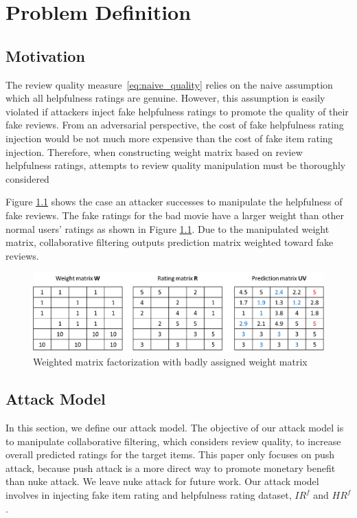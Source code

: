 \documentclass[master,english,final]{kaist-ucs}
\begin{document}
\chapter{Problem Definition}
\section{Motivation}
The review quality measure~\ref{eq:naive_quality} relies on the naive assumption which all helpfulness ratings are genuine.
However, this assumption is easily violated if attackers inject fake helpfulness ratings to promote the quality of their fake reviews.
From an adversarial perspective, the cost of fake helpfulness rating injection would be not much more expensive than the cost of fake item rating injection.
Therefore, when constructing weight matrix based on review helpfulness ratings, attempts to review quality manipulation must be thoroughly considered

Figure \ref{wmf_bad} shows the case an attacker successes to manipulate the helpfulness of fake reviews.
The fake ratings for the bad movie have a larger weight than other normal users' ratings as shown in Figure \ref{wmf_bad}.
Due to the manipulated weight matrix, collaborative filtering outputs prediction matrix weighted toward fake reviews.
\begin{figure}[h]
    \centerline{\includegraphics[width=12.5cm]{figure/wmf_bad}}
    \caption{  Weighted matrix factorization with badly assigned weight matrix  } \label{wmf_bad}
\end{figure}


\section{Attack Model}
In this section, we define our attack model. 
The objective of our attack model is to manipulate collaborative filtering, which considers review quality, to increase overall predicted ratings for the target items.
This paper only focuses on push attack, because push attack is a more direct way to promote monetary benefit than nuke attack.
We leave nuke attack for future work.
Our attack model involves in injecting fake item rating and helpfulness rating dataset, $IR^f$ and $HR^f$.
\end{document}
